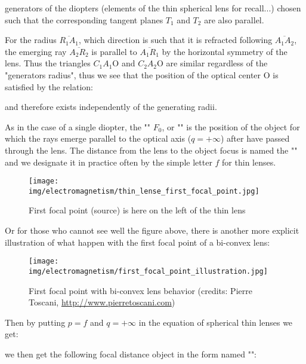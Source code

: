 	generators of the diopters (elements of the thin spherical lens for recall...) chosen such that the corresponding tangent planes $T_1$ and $T_2$ are also parallel.

	For the radius $\overline{R_1A_1}$, which direction is such that it is refracted following $\overline{A_1A_2}$, the emerging ray $\overline{A_2R_2}$ is parallel to $\overline{A_1R_1}$ by the horizontal symmetry of the lens. Thus the triangles $C_1A_1\text{O}$ and $C_2A_2\text{O}$ are similar regardless of the "generators radius", thus we see that the position of the optical center O is satisfied by the relation:
	
	and therefore exists independently of the generating radii.
	
	As in the case of a single diopter, the "" $F_0$, or "" is the position of the object for which the rays emerge parallel to the optical axis ($q=+\infty$) after have passed through the lens. The distance from the lens to the object focus is named the "" and we designate it in practice often by the simple letter $f$ for thin lenses.
	\begin{figure}[H]
		\centering
		\texttt{[image: img/electromagnetism/thin\_lense\_first\_focal\_point.jpg]}
		\caption{First focal point (source) is here on the left of the thin lens}
	\end{figure}
	Or for those who cannot see well the figure above, there is another more explicit illustration of what happen with the first focal point of a bi-convex lens:
	\begin{figure}[H]
		\centering
		\texttt{[image: img/electromagnetism/first\_focal\_point\_illustration.jpg]}
		\caption{First focal point with bi-convex lens behavior (credits: Pierre Toscani, \url{http://www.pierretoscani.com})}
	\end{figure}
	Then by putting $p=f$ and $q=+\infty$ in the equation of spherical thin lenses we get:
	
	we then get the following focal distance object in the form named "":
	
